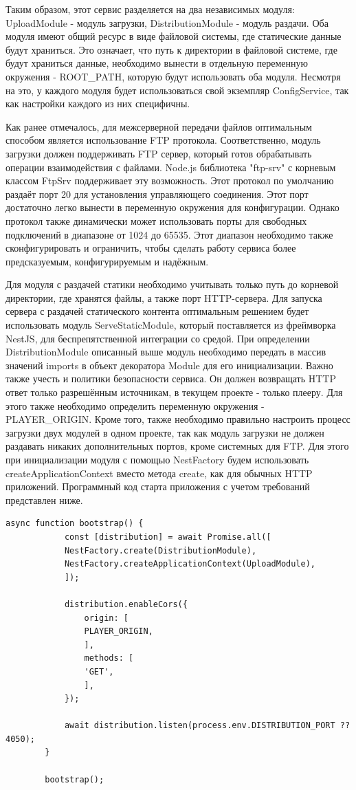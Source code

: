 	Таким образом, этот сервис разделяется на два независимых модуля: UploadModule - модуль загрузки, DistributionModule - модуль раздачи. Оба модуля имеют общий ресурс в виде файловой системы, где статические данные будут храниться. Это означает, что путь к директории в файловой системе, где будут храниться данные, необходимо вынести в отдельную переменную окружения - ROOT\_PATH, которую будут использовать оба модуля. Несмотря на это, у каждого модуля будет использоваться свой экземпляр ConfigService, так как настройки каждого из них специфичны.

	Как ранее отмечалось, для межсерверной передачи файлов оптимальным способом является использование FTP протокола. Соответственно, модуль загрузки должен поддерживать FTP сервер, который готов обрабатывать операции взаимодействия с файлами. Node.js библиотека "ftp-srv" с корневым классом FtpSrv поддерживает эту возможность. Этот протокол по умолчанию раздаёт порт 20 для установления управляющего соединения. Этот порт достаточно легко вынести в переменную окружения для конфигурации. Однако протокол также динамически может использовать порты для свободных подключений в диапазоне от 1024 до 65535. Этот диапазон необходимо также сконфигурировать и ограничить, чтобы сделать работу сервиса более предсказуемым, конфигурируемым и надёжным.

	Для модуля с раздачей статики необходимо учитывать только путь до корневой директории, где хранятся файлы, а также порт HTTP-сервера. Для запуска сервера с раздачей статического контента оптимальным решением будет использовать модуль ServeStaticModule, который поставляется из фреймворка NestJS, для беспрепятственной интеграции со средой. При определении DistributionModule описанный выше модуль необходимо передать в массив значений imports в объект декоратора Module для его инициализации. Важно также учесть и политики безопасности сервиса. Он должен возвращать HTTP ответ только разрешённым источникам, в текущем проекте - только плееру. Для этого также необходимо определить переменную окружения - PLAYER\_ORIGIN.
	Кроме того, также необходимо правильно настроить процесс загрузки двух модулей в одном проекте, так как модуль загрузки не должен раздавать никаких дополнительных портов, кроме системных для FTP. Для этого при инициализации модуля с помощью NestFactory будем использовать createApplicationContext вместо метода create, как для обычных HTTP приложений. Программный код старта приложения с учетом требований представлен ниже.

	\begin{lstlisting}[caption=Код старта сервиса-хранилища]
		async function bootstrap() {
			const [distribution] = await Promise.all([
			NestFactory.create(DistributionModule),
			NestFactory.createApplicationContext(UploadModule),
			]);
			
			distribution.enableCors({
				origin: [
				PLAYER_ORIGIN,
				],
				methods: [
				'GET',
				],
			});
			
			await distribution.listen(process.env.DISTRIBUTION_PORT ?? 4050);
		}
		
		bootstrap();
	\end{lstlisting}

